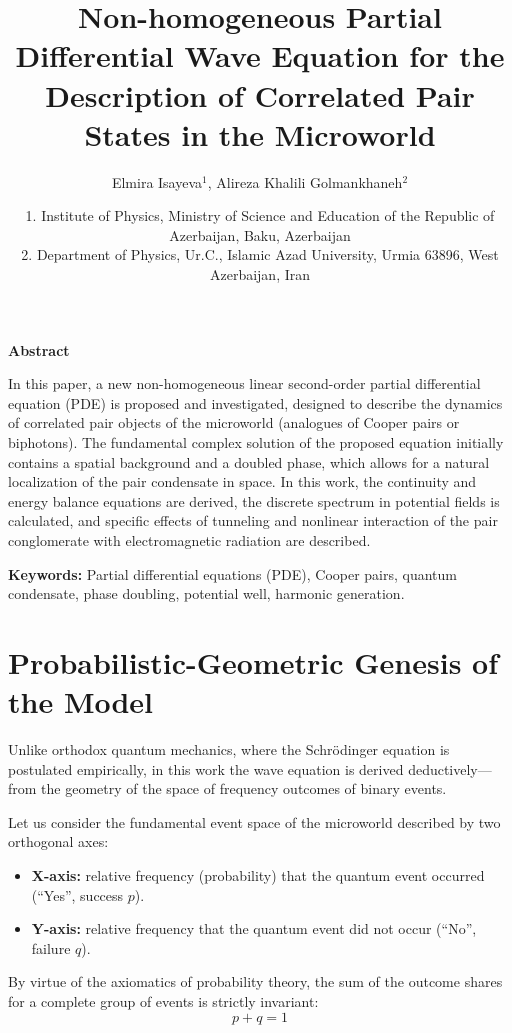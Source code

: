 \documentclass{article}
\title{Non-homogeneous Partial Differential Wave Equation for the Description of Correlated Pair States in the Microworld}
\author{Elmira Isayeva$^{1}$, Alireza Khalili Golmankhaneh$^{2}$}
\date{1. Institute of Physics, Ministry of Science and Education of the Republic of Azerbaijan, Baku, Azerbaijan\\
2. Department of Physics, Ur.C., Islamic Azad University, Urmia 63896, West Azerbaijan, Iran}
\begin{document}
\maketitle

\textbf{Abstract }

\vspace{0.5cm}
In this paper, a new non-homogeneous linear second-order partial differential equation (PDE) is proposed and investigated, designed to describe the dynamics of correlated pair objects of the microworld (analogues of Cooper pairs or biphotons). The fundamental complex solution of the proposed equation initially contains a spatial background and a doubled phase, which allows for a natural localization of the pair condensate in space. In this work, the continuity and energy balance equations are derived, the discrete spectrum in potential fields is calculated, and specific effects of tunneling and nonlinear interaction of the pair conglomerate with electromagnetic radiation are described.

\vspace{0.5cm}

\textbf{Keywords:} Partial differential equations (PDE), Cooper pairs, quantum condensate, phase doubling, potential well, harmonic generation.


\vspace{0.5cm}

\section{ Probabilistic-Geometric Genesis of the Model}
Unlike orthodox quantum mechanics, where the Schrödinger equation is postulated empirically, in this work the wave equation is derived deductively—from the geometry of the space of frequency outcomes of binary events.

Let us consider the fundamental event space of the microworld described by two orthogonal axes:
\begin{itemize}
    \item \textbf{X-axis:} relative frequency (probability) that the quantum event occurred (``Yes'', success $p$).
    \item \textbf{Y-axis:} relative frequency that the quantum event did not occur (``No'', failure $q$).
\end{itemize}

By virtue of the axiomatics of probability theory, the sum of the outcome shares for a complete group of events is strictly invariant:
\begin{equation}
p + q = 1
\end{equation}
\end{document}
